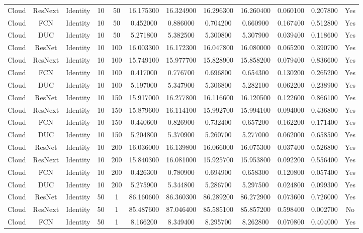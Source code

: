 \begin{tabular}{|c||c||c||c||c||c||c||c||c||c||c||c|}
Cloud & ResNext & Identity & 10 & 50 & 16.175300 & 16.324900 & 16.296300 & 16.260400 & 0.060100 & 0.207800 & Yes \\
Cloud & FCN & Identity & 10 & 50 & 0.452000 & 0.886000 & 0.704200 & 0.660900 & 0.167400 & 0.512800 & Yes \\
Cloud & DUC & Identity & 10 & 50 & 5.271800 & 5.382500 & 5.300800 & 5.307900 & 0.039400 & 0.118600 & Yes \\
Cloud & ResNet & Identity & 10 & 100 & 16.003300 & 16.172300 & 16.047800 & 16.080000 & 0.065200 & 0.390700 & Yes \\
Cloud & ResNext & Identity & 10 & 100 & 15.749100 & 15.977700 & 15.828900 & 15.858200 & 0.079400 & 0.836600 & Yes \\
Cloud & FCN & Identity & 10 & 100 & 0.417000 & 0.776700 & 0.696800 & 0.654300 & 0.130200 & 0.265200 & Yes \\
Cloud & DUC & Identity & 10 & 100 & 5.197000 & 5.347900 & 5.306800 & 5.282100 & 0.062200 & 0.238900 & Yes \\
Cloud & ResNet & Identity & 10 & 150 & 15.917000 & 16.277800 & 16.116600 & 16.120500 & 0.122600 & 0.866100 & Yes \\
Cloud & ResNext & Identity & 10 & 150 & 15.879600 & 16.114100 & 15.992700 & 15.994100 & 0.094000 & 0.436800 & Yes \\
Cloud & FCN & Identity & 10 & 150 & 0.440600 & 0.826900 & 0.732400 & 0.657200 & 0.162200 & 0.171400 & Yes \\
Cloud & DUC & Identity & 10 & 150 & 5.204800 & 5.370900 & 5.260700 & 5.277000 & 0.062000 & 0.658500 & Yes \\
Cloud & ResNet & Identity & 10 & 200 & 16.036000 & 16.139800 & 16.066000 & 16.075300 & 0.037400 & 0.526800 & Yes \\
Cloud & ResNext & Identity & 10 & 200 & 15.840300 & 16.081000 & 15.925700 & 15.953800 & 0.092200 & 0.556400 & Yes \\
Cloud & FCN & Identity & 10 & 200 & 0.426300 & 0.780900 & 0.694900 & 0.658300 & 0.120800 & 0.057400 & Yes \\
Cloud & DUC & Identity & 10 & 200 & 5.275900 & 5.344800 & 5.286700 & 5.297500 & 0.024800 & 0.099300 & Yes \\
Cloud & ResNet & Identity & 50 & 1 & 86.160600 & 86.360300 & 86.289200 & 86.272900 & 0.073600 & 0.726000 & Yes \\
Cloud & ResNext & Identity & 50 & 1 & 85.487600 & 87.046400 & 85.585100 & 85.857200 & 0.598400 & 0.002700 & No \\
Cloud & FCN & Identity & 50 & 1 & 8.166200 & 8.349400 & 8.295700 & 8.262800 & 0.070800 & 0.404000 & Yes \\

\end{tabular}

